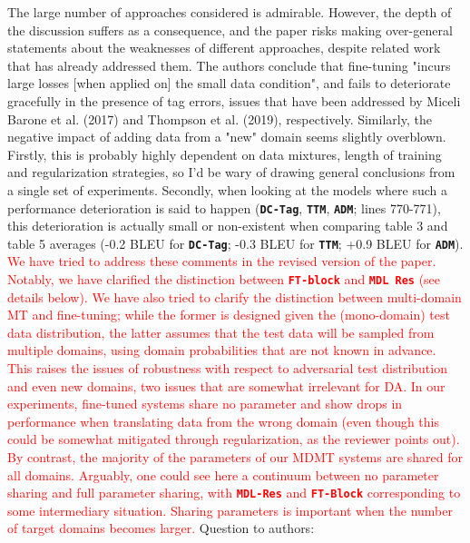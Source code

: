 \documentclass[12pt,times,a4paper,twoside]{article}
\theoremstyle{definition}
\newcommand{\system}[1]{\texttt{\textbf{#1}}}
\begin{document}
The large number of approaches considered is admirable. However, the depth of the discussion suffers as a consequence, and the paper risks making over-general statements about the weaknesses of different approaches, despite related work that has already addressed them. The authors conclude that fine-tuning "incurs large losses [when applied on] the small data condition", and fails to deteriorate gracefully in the presence of tag errors, issues that have been addressed by Miceli Barone et al. (2017) and Thompson et al. (2019), respectively. Similarly, the negative impact of adding data from a "new" domain seems slightly overblown. Firstly, this is probably highly dependent on data mixtures, length of training and regularization strategies, so I'd be wary of drawing general conclusions from a single set of experiments. Secondly, when looking at the models where such a performance deterioration is said to happen (\system{DC-Tag}, \system{TTM}, \system{ADM}; lines 770-771), this deterioration is actually small or non-existent when comparing table 3 and table 5 averages (-0.2 BLEU for \system{DC-Tag}; -0.3 BLEU for \system{TTM}; +0.9 BLEU for \system{ADM}).
\\
\textcolor{red}{%
  We have tried to address these comments in the revised version of the paper. Notably, we have clarified the distinction between \system{FT-block} and \system{MDL Res} (see details below). We have also tried to clarify the distinction between multi-domain MT and fine-tuning; while the former is designed given the (mono-domain) test data distribution, the latter assumes that the test data will be sampled from multiple domains, using domain probabilities that are not known in advance. This raises the issues of robustness with respect to adversarial test distribution and even new domains, two issues that are somewhat irrelevant for DA.
\newline
In our experiments, fine-tuned systems share no parameter and show drops in performance when translating data from the wrong domain (even though this could be somewhat mitigated through regularization, as the reviewer points out). By contrast, the majority of the parameters of our MDMT systems are shared for all domains. Arguably, one could see here a continuum between no parameter sharing and full parameter sharing, with \system{MDL-Res} and \system{FT-Block} corresponding to some intermediary situation. Sharing parameters is important when the number of target domains becomes larger.
}
\noindent Question to authors:
\end{document}
